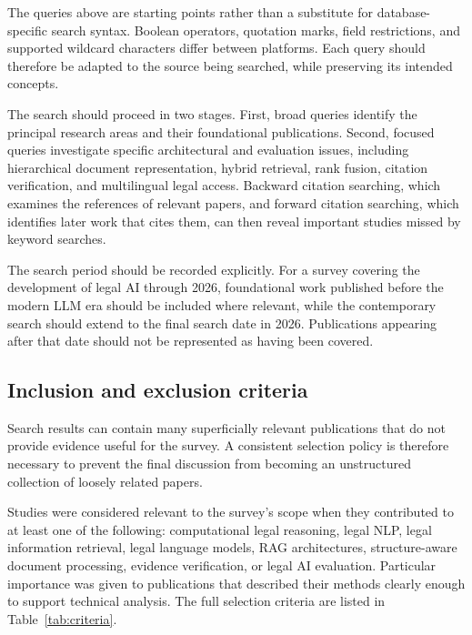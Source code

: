 The queries above are starting points rather than a substitute for database-specific search
syntax. Boolean operators, quotation marks, field restrictions, and supported wildcard characters
differ between platforms. Each query should therefore be adapted to the source being searched,
while preserving its intended concepts.

The search should proceed in two stages. First, broad queries identify the principal research
areas and their foundational publications. Second, focused queries investigate specific
architectural and evaluation issues, including hierarchical document representation, hybrid
retrieval, rank fusion, citation verification, and multilingual legal access. Backward citation
searching, which examines the references of relevant papers, and forward citation searching, which
identifies later work that cites them, can then reveal important studies missed by keyword
searches.

The search period should be recorded explicitly. For a survey covering the development of legal AI
through 2026, foundational work published before the modern LLM era should be included where
relevant, while the contemporary search should extend to the final search date in 2026.
Publications appearing after that date should not be represented as having been covered.

\subsection{Inclusion and exclusion criteria}

Search results can contain many superficially relevant publications that do not provide evidence
useful for the survey. A consistent selection policy is therefore necessary to prevent the final
discussion from becoming an unstructured collection of loosely related papers.

Studies were considered relevant to the survey's scope when they contributed to at least one of
the following: computational legal reasoning, legal NLP, legal information retrieval, legal
language models, RAG architectures, structure-aware document processing, evidence verification, or
legal AI evaluation. Particular importance was given to publications that described their methods
clearly enough to support technical analysis. The full selection criteria are listed in
Table~\ref{tab:criteria}.

